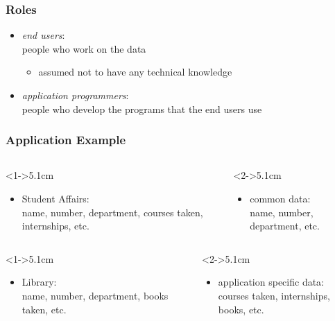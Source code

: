 \documentclass[dvipsnames]{beamer}
\theoremstyle{plain}
\begin{document}
\begin{frame}
  \frametitle{Roles}

  \begin{itemize}
    \item \emph{end users}:\\
      people who work on the data
    \begin{itemize}
      \item assumed not to have any technical knowledge
    \end{itemize}

    \pause
    \bigskip
    \item \emph{application programmers}:\\
      people who develop the programs that the end users use
  \end{itemize}
\end{frame}

\begin{frame}
  \frametitle{Application Example}

  \begin{example}
    \begin{columns}[t]
      \begin{column}<1->{5.1cm}
      \begin{itemize}
        \item Student Affairs:\\
          name, number, department, courses taken, internships, etc.
      \end{itemize}
      \end{column}

      \begin{column}<2->{5.1cm}
      \begin{itemize}
        \item common data:\\
          name, number, department, etc.
      \end{itemize}
      \end{column}
    \end{columns}

    \begin{columns}[t]
      \begin{column}<1->{5.1cm}
      \begin{itemize}
        \item Library:\\
          name, number, department, books taken, etc.
      \end{itemize}
      \end{column}

      \begin{column}<2->{5.1cm}
      \begin{itemize}
        \item application specific data:\\
          courses taken, internships, books, etc.
      \end{itemize}
      \end{column}
    \end{columns}
  \end{example}
\end{frame}
\end{document}
